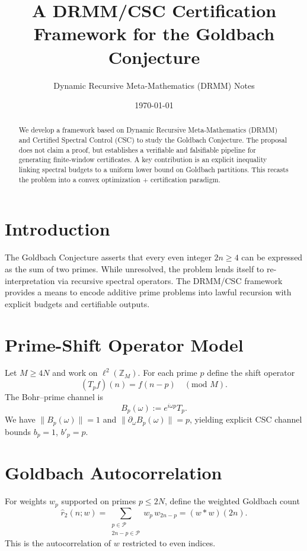 \documentclass[11pt]{article}
\title{A DRMM/CSC Certification Framework for the Goldbach Conjecture}
\author{Dynamic Recursive Meta-Mathematics (DRMM) Notes}
\date{\today}
\begin{document}
\maketitle

\begin{abstract}
We develop a framework based on Dynamic Recursive Meta-Mathematics (DRMM) and Certified Spectral Control (CSC) to study the Goldbach Conjecture. The proposal does not claim a proof, but establishes a verifiable and falsifiable pipeline for generating finite-window certificates. A key contribution is an explicit inequality linking spectral budgets to a uniform lower bound on Goldbach partitions. This recasts the problem into a convex optimization + certification paradigm.
\end{abstract}

\section{Introduction}
The Goldbach Conjecture asserts that every even integer $2n \geq 4$ can be expressed as the sum of two primes. While unresolved, the problem lends itself to re-interpretation via recursive spectral operators. The DRMM/CSC framework provides a means to encode additive prime problems into lawful recursion with explicit budgets and certifiable outputs.

\section{Prime-Shift Operator Model}
Let $M \geq 4N$ and work on $\ell^2(\mathbb{Z}_M)$. For each prime $p$ define the shift operator
\begin{equation}
    (T_p f)(n) = f(n-p) \quad (\text{mod } M).
\end{equation}
The Bohr--prime channel is
\begin{equation}
    B_p(\omega) := e^{i \omega p} T_p.
\end{equation}
We have $\|B_p(\omega)\|=1$ and $\|\partial_\omega B_p(\omega)\| = p$, yielding explicit CSC channel bounds $b_p=1$, $b'_p=p$.

\section{Goldbach Autocorrelation}
For weights $w_p$ supported on primes $p\leq 2N$, define the weighted Goldbach count
\begin{equation}
    \widehat r_2(n;w) = \sum_{\substack{p\in\mathcal P \\ 2n-p\in\mathcal P}} w_p \, w_{2n-p} = (w*w)(2n).
\end{equation}
This is the autocorrelation of $w$ restricted to even indices.
\end{document}
